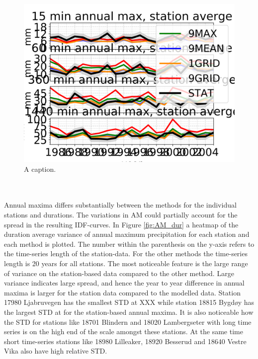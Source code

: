 \begin{figure}[hbt!]
    \centering
    \includegraphics[scale=0.8]{figures/AM_stat_mod.png}
    \caption{A caption.}
    \label{fig:AM_stat_mod}
\end{figure}
\\
\\
Annual maxima differs substantially between the methods for the individual stations and durations. The variations in AM could partially account for the spread in the resulting IDF-curves. In Figure \ref{fig:AM_dur} a heatmap of the duration average variance of annual maximum precipitation for each station and each method is plotted. The number within the parenthesis on the y-axis refers to the time-series length of the station-data. For the other methods the time-series length is 20 years for all stations. The most noticeable feature is the large range of variance on the station-based data compared to the other method. Large variance indicates large spread, and hence the year to year difference in annual maxima is larger for the station data compared to the modelled data. Station 17980 Ljabruvegen has the smallest STD at XXX while station 18815 Bygdøy has the largest STD at for the station-based annual maxima. It is also noticeable how the STD for stations like 18701 Blindern and 18020 Lambergseter with long time series is on the high end of the scale amongst these stations. At the same time short time-series stations like 18980 Lilleaker, 18920 Besserud and 18640 Vestre Vika also have high relative STD.  

